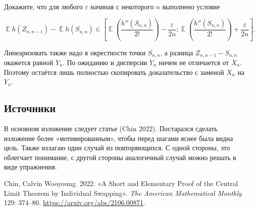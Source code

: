 \documentclass[
  letterpaper,
  DIV=11,
  numbers=noendperiod]{scrartcl}
\newlength{\cslhangindent}
\newenvironment{CSLReferences}[2] %
 {\begin{list}{}{%
  \setlength{\itemindent}{0pt}
  \setlength{\leftmargin}{0pt}
  \setlength{\parsep}{0pt}
  \ifodd #1
   \setlength{\leftmargin}{\cslhangindent}
   \setlength{\itemindent}{-1\cslhangindent}
  \fi
  \setlength{\itemsep}{#2\baselineskip}}}
 {\end{list}}
\DeclareMathOperator{\E}{\mathbb{E}}
\begin{document}
\begin{tcolorbox}[enhanced jigsaw, titlerule=0mm, colframe=quarto-callout-caution-color-frame, colback=white, coltitle=black, leftrule=.75mm, rightrule=.15mm, toprule=.15mm, left=2mm, breakable, bottomrule=.15mm, bottomtitle=1mm, toptitle=1mm, opacitybacktitle=0.6, title=\textcolor{quarto-callout-caution-color}{\faFire}\hspace{0.5em}{Упражнение к теореме}, arc=.35mm, colbacktitle=quarto-callout-caution-color!10!white, opacityback=0]

Докажите, что для любого \(\varepsilon\) начиная с некоторого \(n\)
выполнено условие

\[
\E h(Z_{n,n-1}) - \E h(S_{n,n}) \in \left[ \E\left(\frac{h''(S_{n,n})}{2!}\right) - \frac{\varepsilon}{2n}; \E\left(\frac{h''(S_{n,n})}{2!}\right) + \frac{\varepsilon}{2n} \right].
\]

\end{tcolorbox}

\begin{tcolorbox}[enhanced jigsaw, titlerule=0mm, colframe=quarto-callout-caution-color-frame, colback=white, coltitle=black, leftrule=.75mm, rightrule=.15mm, toprule=.15mm, left=2mm, breakable, bottomrule=.15mm, bottomtitle=1mm, toptitle=1mm, opacitybacktitle=0.6, title=\textcolor{quarto-callout-caution-color}{\faFire}\hspace{0.5em}{Решение упражнения к теореме}, arc=.35mm, colbacktitle=quarto-callout-caution-color!10!white, opacityback=0]

Линеаризовать также надо в окрестности точки \(S_{n,n}\), а разница
\(Z_{n,n-1}-S_{n,n}\) окажется равной \(Y_n\). По ожиданию и дисперсии
\(Y_n\) ничем не отличается от \(X_n\). Поэтому остаётся лишь полностью
скопировать доказательство с заменой \(X_n\) на \(Y_n\).

\end{tcolorbox}

\subsection{Источники}\label{ux438ux441ux442ux43eux447ux43dux438ux43aux438}

В основном изложение следует статье (Chin 2022). Постарался сделать
изложение более «мотивированным», чтобы перед шагами яснее была видна
цель. Также излагаю один случай из повторяющихся. С одной стороны, это
облегчает понимание, с другой стороны аналогичный случай можно решать в
виде упражнения.

\label{refs}
\begin{CSLReferences}{1}{0}
Chin, Calvin Wooyoung. 2022. {«A Short and Elementary Proof of the
Central Limit Theorem by Individual Swapping»}. \emph{The American
Mathematical Monthly} 129: 374--80.
\url{https://arxiv.org/abs/2106.00871}.

\end{CSLReferences}
\end{document}
